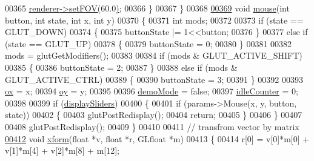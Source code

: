 \begin{DoxyCode}
{{{00365         \hyperlink{particles_8cpp_a748beea58f866663fc6894969b21d061}{renderer}\hyperlink{class_particle_renderer_ad6da663d3073401a776edb8dc6cf4d5f}{->}\hyperlink{class_particle_renderer_ad6da663d3073401a776edb8dc6cf4d5f}{setFOV}\hyperlink{class_particle_renderer_ad6da663d3073401a776edb8dc6cf4d5f}{(}60.0\hyperlink{class_particle_renderer_ad6da663d3073401a776edb8dc6cf4d5f}{)};
00366     \}
00367 \}
00368 
\hypertarget{particles_8cpp_source_l00369}{}\hyperlink{particles_8cpp_ac76a5d78172a826cd6ee9512b89a86c0}{00369} \textcolor{keywordtype}{void} \hyperlink{particles_8cpp_ac76a5d78172a826cd6ee9512b89a86c0}{mouse}(\textcolor{keywordtype}{int} button, \textcolor{keywordtype}{int} state, \textcolor{keywordtype}{int} x, \textcolor{keywordtype}{int} y)
00370 \{
00371     \textcolor{keywordtype}{int} mods;
00372 
00373     \textcolor{keywordflow}{if} (state == GLUT\_DOWN)
00374     \{
00375         buttonState |= 1<<button;
00376     \}
00377     \textcolor{keywordflow}{else} \textcolor{keywordflow}{if} (state == GLUT\_UP)
00378     \{
00379         buttonState = 0;
00380     \}
00381 
00382     mods = glutGetModifiers();
00383 
00384     \textcolor{keywordflow}{if} (mods & GLUT\_ACTIVE\_SHIFT)
00385     \{
00386         buttonState = 2;
00387     \}
00388     \textcolor{keywordflow}{else} \textcolor{keywordflow}{if} (mods & GLUT\_ACTIVE\_CTRL)
00389     \{
00390         buttonState = 3;
00391     \}
00392 
00393     \hyperlink{particles_8cpp_afef635ed3c73fc60d8faf6dd610c4298}{ox} = x;
00394     \hyperlink{particles_8cpp_a791e26888be6777cd5c5d0c736a06821}{oy} = y;
00395 
00396     \hyperlink{particles_8cpp_a9349b8b38abdf797b46a9e80020286e7}{demoMode} = \textcolor{keyword}{false};
00397     \hyperlink{particles_8cpp_a0c97fe3f7367dfa94ab0d5976ed785a8}{idleCounter} = 0;
00398 
00399     \textcolor{keywordflow}{if} (\hyperlink{particles_8cpp_ac345a677e529047cf89d33fc26f10fe7}{displaySliders})
00400     \{
00401         \textcolor{keywordflow}{if} (params->Mouse(x, y, button, state))
00402         \{
00403             glutPostRedisplay();
00404             \textcolor{keywordflow}{return};
00405         \}
00406     \}
00407 
00408     glutPostRedisplay();
00409 \}
00410 
00411 \textcolor{comment}{// transfrom vector by matrix}
\hypertarget{particles_8cpp_source_l00412}{}\hyperlink{particles_8cpp_ad95532e0e925e7584a930b366a613261}{00412} \textcolor{keywordtype}{void} \hyperlink{particles_8cpp_ad95532e0e925e7584a930b366a613261}{xform}(\textcolor{keywordtype}{float} *v, \textcolor{keywordtype}{float} *r, GLfloat *m)
00413 \{
00414     r[0] = v[0]*m[0] + v[1]*m[4] + v[2]*m[8] + m[12];
}}}
\end{DoxyCode}
